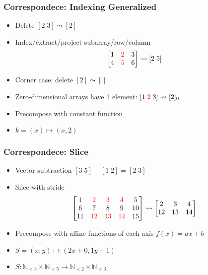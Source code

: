 \documentclass[xetex,mathserif,serif]{beamer}
\newcommand\Nat{\mathbb{N}}
\newcommand\NB[1]{\textcolor{red}{#1}}
\begin{document}
\begin{frame}
  \frametitle{Correspondece: Indexing Generalized}
  \begin{itemize}%
    \item Delete \([2\;3] \leadsto [2]\)
    \item Index/extract/project subarray/row/column
      \[
        \begin{bmatrix}
          1 & \NB 2 & 3 \\ 4 & \NB 5 & 6
        \end{bmatrix} \leadsto
        [2\;5]
      \]
    \item Corner case: delete \([2] \leadsto []\)
    \item Zero-dimensional arrays have 1 element: \([1\;\NB 2\;3] \leadsto [2]_0\)
    \item Precompose with constant function
    \item \(k = (x)\mapsto (x, 2)\)
  \end{itemize}
\end{frame}

\begin{frame}
  \frametitle{Correspondece: Slice}
  \begin{itemize}%
    \item Vector subtraction \( [3\;5] - [1\;2] = [2\;3] \)
    \item Slice with stride
      \[
        \begin{bmatrix}
          1 & \NB 2 & \NB 3 & \NB 4 & 5 \\
          6 & 7 & 8 &  9 & 10 \\
          11 & \NB{12} & \NB{13} & \NB{14} & 15
        \end{bmatrix} \leadsto \begin{bmatrix}
          2 & 3 & 4 \\
          12 & 13 & 14
        \end{bmatrix}
      \]
    \item Precompose with affine functions of each axis \(f(x) = ax + b\)
    \item \(S = (x, y) \mapsto (2x + 0, 1y + 1)\)
    \item \(S : \Nat_{<3}\times\Nat_{<5} \to \Nat_{<2}\times\Nat_{<3}\)
  \end{itemize}
\end{frame}
\end{document}
